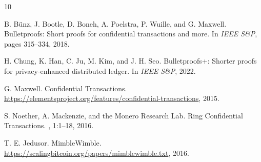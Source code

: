 \documentclass[11pt,a4paper]{article}
\begin{document}

\begin{thebibliography}{10}

B. B\"unz, J. Bootle, D. Boneh, A. Poelstra, P. Wuille, and G. Maxwell.
\newblock Bulletproofs: Short proofs for confidential transactions and more.
\newblock In {\em IEEE S\&P}, pages 315--334, 2018.

H. Chung, K. Han, C. Ju, M. Kim, and J. H. Seo.
\newblock Bulletproofs+: Shorter proofs for privacy-enhanced distributed ledger.
\newblock In {\em IEEE S\&P}, 2022.

G. Maxwell.
\newblock Confidential Transactions.
\newblock \url{https://elementsproject.org/features/confidential-transactions}, 2015.

S. Noether, A. Mackenzie, and the Monero Research Lab.
\newblock Ring Confidential Transactions.
, 1:1--18, 2016.

T. E. Jedusor.
\newblock MimbleWimble.
\newblock \url{https://scalingbitcoin.org/papers/mimblewimble.txt}, 2016.

\end{thebibliography}
\end{document}
